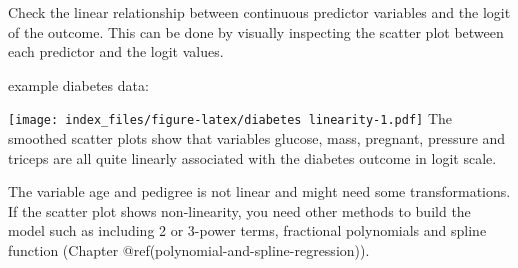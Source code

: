 \documentclass[
]{article}
\newenvironment{Shaded}{\begin{snugshade}}{\end{snugshade}}
\newcommand{\CommentTok}[1]{\textcolor[rgb]{0.56,0.35,0.01}{\textit{#1}}}
\newcommand{\DataTypeTok}[1]{\textcolor[rgb]{0.13,0.29,0.53}{#1}}
\newcommand{\DecValTok}[1]{\textcolor[rgb]{0.00,0.00,0.81}{#1}}
\newcommand{\FloatTok}[1]{\textcolor[rgb]{0.00,0.00,0.81}{#1}}
\newcommand{\KeywordTok}[1]{\textcolor[rgb]{0.13,0.29,0.53}{\textbf{#1}}}
\newcommand{\NormalTok}[1]{#1}
\newcommand{\OperatorTok}[1]{\textcolor[rgb]{0.81,0.36,0.00}{\textbf{#1}}}
\newcommand{\StringTok}[1]{\textcolor[rgb]{0.31,0.60,0.02}{#1}}
\begin{document}
Check the linear relationship between continuous predictor variables and
the logit of the outcome. This can be done by visually inspecting the
scatter plot between each predictor and the logit values.

example diabetes data:

\begin{Shaded}
\end{Shaded}

\texttt{[image: index\_files/figure-latex/diabetes linearity-1.pdf]} The
smoothed scatter plots show that variables glucose, mass, pregnant,
pressure and triceps are all quite linearly associated with the diabetes
outcome in logit scale.

The variable age and pedigree is not linear and might need some
transformations. If the scatter plot shows non-linearity, you need other
methods to build the model such as including 2 or 3-power terms,
fractional polynomials and spline function (Chapter
@ref(polynomial-and-spline-regression)).
\end{document}
